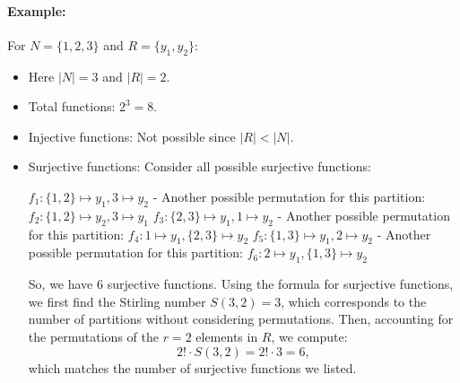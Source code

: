 \documentclass[docmute]{article}
\begin{document}
\paragraph{Example:}  
For \( N = \{1, 2, 3\} \) and \( R = \{y_1, y_2\} \):
\begin{itemize}[nosep]
    \item[] Here \( |N| = 3 \) and \( |R| = 2 \).
    \item Total functions: $2^3 = 8$.
    \item Injective functions: Not possible since $|R|<|N|$.
    \item Surjective functions: Consider all possible surjective functions:

 \( f_1: \{1, 2\} \mapsto y_1, 3 \mapsto y_2 \)
- Another possible permutation for this partition: \( f_2: \{1, 2\} \mapsto y_2, 3 \mapsto y_1 \)
 \( f_3: \{2, 3\} \mapsto y_1, 1 \mapsto y_2 \)
- Another possible permutation for this partition: \( f_4: 1 \mapsto y_1, \{2, 3\} \mapsto y_2 \)
 \( f_5: \{1, 3\} \mapsto y_1, 2 \mapsto y_2 \)
- Another possible permutation for this partition: \( f_6: 2 \mapsto y_1, \{1, 3\} \mapsto y_2 \)

So, we have 6 surjective functions. Using the formula for surjective functions, we first find the Stirling number \( S(3, 2) = 3 \), which corresponds to the number of partitions without considering permutations. Then, accounting for the permutations of the \( r = 2 \) elements in \( R \), we compute:
\[
2! \cdot S(3, 2) = 2! \cdot 3 = 6,
\]
which matches the number of surjective functions we listed.
\end{itemize}
\end{document}
